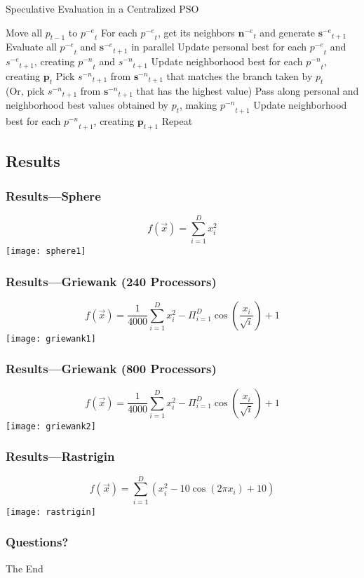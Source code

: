 \documentclass{beamer}
\providecommand{\noeval}[1]{\ensuremath{#1^{-e}}}
\providecommand{\nonbest}[1]{\ensuremath{#1^{-n}}}
\providecommand{\p}{\ensuremath{p}}
\providecommand{\pset}{\ensuremath{\mathbf{p}}}
\providecommand{\s}{\ensuremath{s}}
\providecommand{\sset}{\ensuremath{\mathbf{s}}}
\providecommand{\nset}{\ensuremath{\mathbf{n}}}
\begin{document}
\begin{frame}
  \begin{center}
\begin{algorithm}[H]
  \caption{Speculative Evaluation in a Centralized PSO}
  \label{alg:centralized}
  \begin{algorithmic}[1]
	\STATE Move all $\p_{t-1}$ to $\noeval{\p}_t$
	\STATE For each $\noeval{\p}_t$, get its neighbors $\noeval{\nset}_t$ and
	  generate $\noeval{\sset}_{t+1}$
	\STATE Evaluate all $\noeval{\p}_t$ and $\noeval{\sset}_{t+1}$ in parallel
	\STATE Update personal best for each $\noeval{\p}_t$ and
	  $\noeval{\s}_{t+1}$, creating $\nonbest{\p}_t$ and $\nonbest{\s}_{t+1}$
	\STATE Update neighborhood best for each $\nonbest{\p}_t$, creating
	  $\pset_t$
	\FORALL{$\p_t$}
	\STATE Pick $\nonbest{\s}_{t+1}$ from $\nonbest{\sset}_{t+1}$ that matches
	the branch taken by $\p_t$ \\ (Or, pick $\nonbest{\s}_{t+1}$ from
	$\nonbest{\sset}_{t+1}$ that has the highest value)
	\STATE Pass along personal and neighborhood best values obtained by $\p_t$,
	  making $\nonbest{\p}_{t+1}$
	\ENDFOR
	\STATE Update neighborhood best for each $\nonbest{\p}_{t+1}$, creating
	  $\pset_{t+1}$
	\STATE Repeat
  \end{algorithmic}
\end{algorithm}
  \end{center}
\end{frame}

\subsection{Results}
\begin{frame}
  \begin{center}
	\frametitle{Results---Sphere}
	\[f(\Vec{x}) = \sum_{i=1}^D x_i^2\]
	\texttt{[image: sphere1]}
  \end{center}
\end{frame}
\begin{frame}
  \begin{center}
	\frametitle{Results---Griewank (240 Processors)}
	\[f(\Vec{x}) = \frac{1}{4000} \sum_{i=1}^D x_i^2 - \Pi_{i=1}^D 
	\cos\left(\frac{x_i}{\sqrt{i}}\right) + 1\]
	\texttt{[image: griewank1]}
  \end{center}
\end{frame}
\begin{frame}
  \begin{center}
	\frametitle{Results---Griewank (800 Processors)}
	\[f(\Vec{x}) = \frac{1}{4000} \sum_{i=1}^D x_i^2 - \Pi_{i=1}^D 
	\cos\left(\frac{x_i}{\sqrt{i}}\right) + 1\]
	\texttt{[image: griewank2]}
  \end{center}
\end{frame}
\begin{frame}
  \begin{center}
	\frametitle{Results---Rastrigin}
	\[f(\Vec{x}) = \sum_{i=1}^D \left(x_i^2 - 10\cos\left(2\pi x_i\right) +
	10\right)\]
	\texttt{[image: rastrigin]}
  \end{center}
\end{frame}

\begin{frame}
  \frametitle{Questions?}
  \begin{center}
	\Huge \textrm{The End}
  \end{center}
\end{frame}
\end{document}
